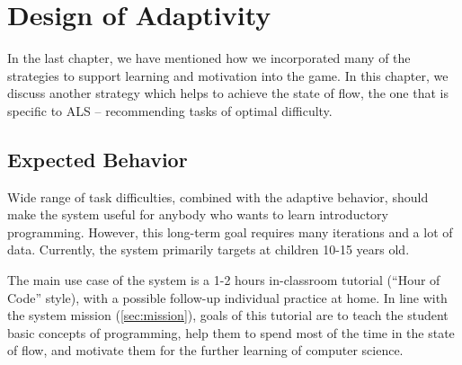 \chapter{Design of Adaptivity}
\label{chap:design-of-adaptivity}

In the last chapter, we have mentioned how we incorporated many of the
strategies to support learning and motivation into the game.
In this chapter, we discuss another strategy which helps to achieve the state of
flow, the one that is specific to ALS  %
-- recommending tasks of optimal difficulty.

\section{Expected Behavior}  %
\label{sec:robomission.behavior}



Wide range of task difficulties, combined with the adaptive behavior,
should make the system useful for anybody who wants to learn
introductory programming.
However, this long-term goal requires many iterations and a lot of data.
Currently, the system primarily targets at children 10-15 years old.

The main use case of the system is a 1-2 hours in-classroom tutorial
(``Hour of Code'' style), with a possible follow-up individual practice at home.
In line with the system mission (\cref{sec:mission}), goals of this tutorial
are to teach the student basic concepts of programming,
help them to spend most of the time in the state of flow,
and motivate them for the further learning of computer science.

